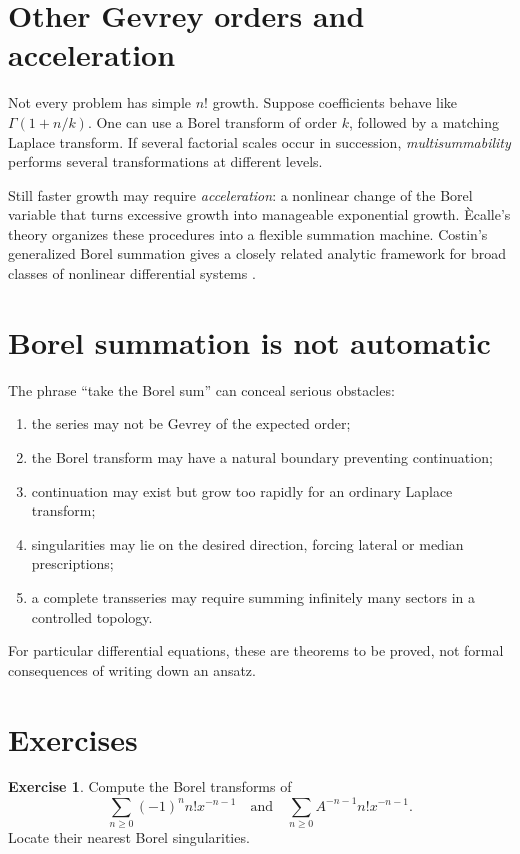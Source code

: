 \documentclass[11pt,openany]{book}
\theoremstyle{definition}
\newtheorem{exercise}{Exercise}[chapter]
\theoremstyle{plain}
\theoremstyle{remark}
\begin{document}
\section{Other Gevrey orders and acceleration}

Not every problem has simple $n!$ growth. Suppose coefficients behave like $\Gamma(1+n/k)$. One can use a Borel transform of order $k$, followed by a matching Laplace transform. If several factorial scales occur in succession, \emph{multisummability} performs several transformations at different levels.

Still faster growth may require \emph{acceleration}: a nonlinear change of the Borel variable that turns excessive growth into manageable exponential growth. \`Ecalle's theory organizes these procedures into a flexible summation machine. Costin's generalized Borel summation gives a closely related analytic framework for broad classes of nonlinear differential systems \cite{costin-1995,costin-1998,costin-book}.

\section{Borel summation is not automatic}

The phrase ``take the Borel sum'' can conceal serious obstacles:
\begin{enumerate}
 \item the series may not be Gevrey of the expected order;
 \item the Borel transform may have a natural boundary preventing continuation;
 \item continuation may exist but grow too rapidly for an ordinary Laplace transform;
 \item singularities may lie on the desired direction, forcing lateral or median prescriptions;
 \item a complete transseries may require summing infinitely many sectors in a controlled topology.
\end{enumerate}

For particular differential equations, these are theorems to be proved, not formal consequences of writing down an ansatz.

\section{Exercises}

\begin{exercise}
Compute the Borel transforms of
\[
 \sum_{n\ge0}(-1)^n n!x^{-n-1}
 \quad\text{and}\quad
 \sum_{n\ge0}A^{-n-1}n!x^{-n-1}.
\]
Locate their nearest Borel singularities.
\end{exercise}
\end{document}
